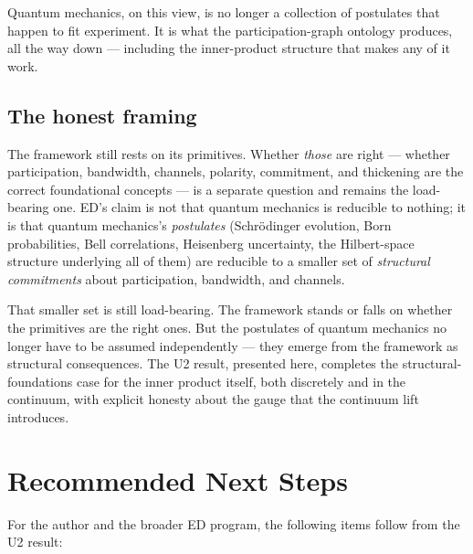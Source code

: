 \documentclass[11pt,a4paper]{article}
\begin{document}
Quantum mechanics, on this view, is no longer a collection of postulates that happen to fit experiment. It is what the participation-graph ontology produces, all the way down --- including the inner-product structure that makes any of it work.

\subsection{The honest framing}

The framework still rests on its primitives. Whether \emph{those} are right --- whether participation, bandwidth, channels, polarity, commitment, and thickening are the correct foundational concepts --- is a separate question and remains the load-bearing one. ED's claim is not that quantum mechanics is reducible to nothing; it is that quantum mechanics's \emph{postulates} (Schr\"odinger evolution, Born probabilities, Bell correlations, Heisenberg uncertainty, the Hilbert-space structure underlying all of them) are reducible to a smaller set of \emph{structural commitments} about participation, bandwidth, and channels.

That smaller set is still load-bearing. The framework stands or falls on whether the primitives are the right ones. But the postulates of quantum mechanics no longer have to be assumed independently --- they emerge from the framework as structural consequences. The U2 result, presented here, completes the structural-foundations case for the inner product itself, both discretely and in the continuum, with explicit honesty about the gauge that the continuum lift introduces.

\section{Recommended Next Steps}

For the author and the broader ED program, the following items follow from the U2 result:
\end{document}
